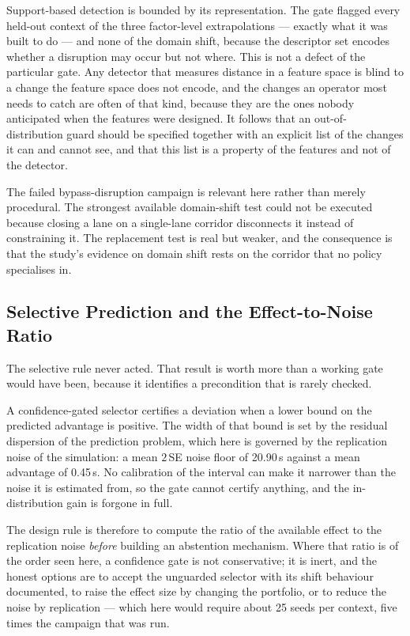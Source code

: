 Support-based detection is bounded by its representation. The gate flagged every
held-out context of the three factor-level extrapolations --- exactly what it was
built to do --- and none of the domain shift, because the descriptor set encodes
whether a disruption may occur but not where. This is not a defect of the
particular gate. Any detector that measures distance in a feature space is blind
to a change the feature space does not encode, and the changes an operator most
needs to catch are often of that kind, because they are the ones nobody
anticipated when the features were designed. It follows that an out-of-
distribution guard should be specified together with an explicit list of the
changes it can and cannot see, and that this list is a property of the features
and not of the detector.

The failed bypass-disruption campaign is relevant here rather than merely
procedural. The strongest available domain-shift test could not be executed
because closing a lane on a single-lane corridor disconnects it instead of
constraining it. The replacement test is real but weaker, and the consequence is
that the study's evidence on domain shift rests on the corridor that no policy
specialises in.

\subsection{Selective Prediction and the Effect-to-Noise Ratio}
\label{sec:disc:selective}

The selective rule never acted. That result is worth more than a working gate
would have been, because it identifies a precondition that is rarely checked.

A confidence-gated selector certifies a deviation when a lower bound on the
predicted advantage is positive. The width of that bound is set by the residual
dispersion of the prediction problem, which here is governed by the replication
noise of the simulation: a mean $2\,$SE noise floor of 20.90\,s against a mean
advantage of 0.45\,s. No calibration of the interval can make it narrower than the
noise it is estimated from, so the gate cannot certify anything, and the
in-distribution gain is forgone in full.

The design rule is therefore to compute the ratio of the available effect to the
replication noise \emph{before} building an abstention mechanism. Where that ratio
is of the order seen here, a confidence gate is not conservative; it is inert, and
the honest options are to accept the unguarded selector with its shift behaviour
documented, to raise the effect size by changing the portfolio, or to reduce the
noise by replication --- which here would require about 25 seeds per context, five
times the campaign that was run.

